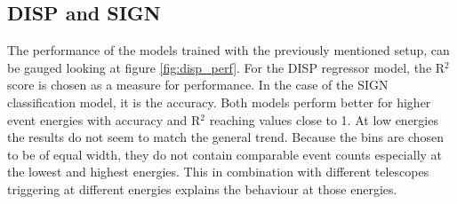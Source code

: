 \subsection{DISP and SIGN}
\label{energy}

The performance of the models trained with the previously mentioned setup,
can be gauged looking at 
figure \ref{fig:disp_perf}. For the DISP regressor model,
the R$^2$ score is chosen as a measure for performance. 
In the case of the SIGN classification model, it is the accuracy.
Both models perform better for higher event energies with accuracy and
R$^2$ reaching values close to 1.
At low energies the results do not seem to match the general trend.
Because the bins are chosen to be of equal width, they do not contain
comparable event counts especially at the lowest and highest energies.
This in combination with different telescopes triggering at different
energies explains the behaviour at those energies.

